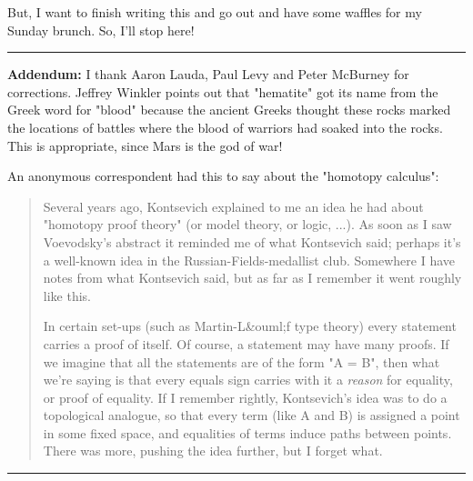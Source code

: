 But, I want to finish writing this and go out and have some waffles
for my Sunday brunch.  So, I'll stop here!

\par\noindent\rule{\textwidth}{0.4pt}
\textbf{Addendum:} I thank Aaron Lauda, Paul Levy
and Peter McBurney for corrections.
Jeffrey Winkler points out that "hematite" got its name 
from the Greek word for "blood" because the ancient Greeks
thought these rocks marked the locations of battles where
the blood of warriors had soaked into the rocks.  This is appropriate,
since Mars is the god of war!   

An anonymous correspondent had this to say 
about the "homotopy \lambda  calculus":

\begin{quote}
 Several years ago, Kontsevich explained
 to me an idea he had about "homotopy proof theory" (or model theory, or
 logic, ...).  As soon as I saw Voevodsky's abstract it reminded me of
 what Kontsevich said; perhaps it's a well-known idea in the
 Russian-Fields-medallist club.  Somewhere I have notes from what
 Kontsevich said, but as far as I remember it went roughly like this.  
 
 In certain set-ups (such as Martin-L&ouml;f type theory) every statement
 carries a proof of itself.  Of course, a statement may have many proofs.
 If we imagine that all the statements are of the form "A = B", then what
 we're saying is that every equals sign carries with it a \emph{reason} for
 equality, or proof of equality.  If I remember rightly, Kontsevich's
 idea was to do a topological analogue, so that every term (like A and B)
 is assigned a point in some fixed space, and equalities of terms induce
 paths between points.  There was more, pushing the idea further, but I
 forget what.  
\end{quote}


\par\noindent\rule{\textwidth}{0.4pt}

